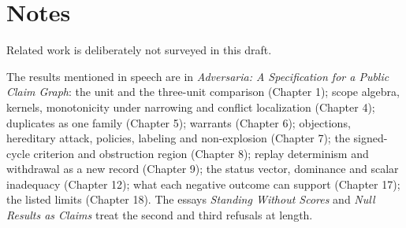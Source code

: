\documentclass[11pt]{article}
\begin{document}
\section*{Notes}


Related work is deliberately not surveyed in this draft.

The results mentioned in speech are in \emph{Adversaria: A Specification for a Public Claim Graph}: the unit and the three-unit comparison (Chapter 1); scope algebra, kernels, monotonicity under narrowing and conflict localization (Chapter 4); duplicates as one family (Chapter 5); warrants (Chapter 6); objections, hereditary attack, policies, labeling and non-explosion (Chapter 7); the signed-cycle criterion and obstruction region (Chapter 8); replay determinism and withdrawal as a new record (Chapter 9); the status vector, dominance and scalar inadequacy (Chapter 12); what each negative outcome can support (Chapter 17); the listed limits (Chapter 18). The essays \emph{Standing Without Scores} and \emph{Null Results as Claims} treat the second and third refusals at length.
\end{document}
